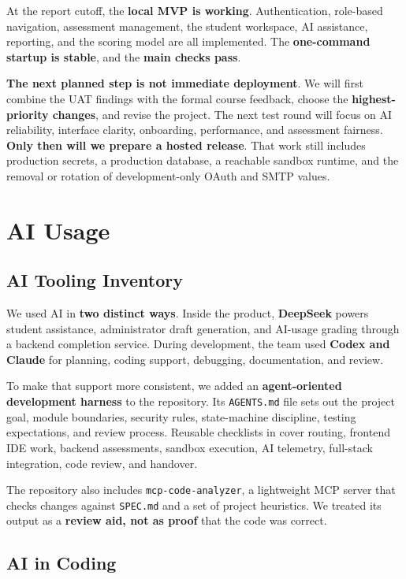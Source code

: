 \documentclass[11pt,a4paper]{article}
\begin{document}
At the report cutoff, the \textbf{local MVP is working}. Authentication, role-based navigation, assessment management, the student workspace, AI assistance, reporting, and the scoring model are all implemented. The \textbf{one-command startup is stable}, and the \textbf{main checks pass}.

\textbf{The next planned step is not immediate deployment}. We will first combine the UAT findings with the formal course feedback, choose the \textbf{highest-priority changes}, and revise the project. The next test round will focus on AI reliability, interface clarity, onboarding, performance, and assessment fairness. \textbf{Only then will we prepare a hosted release}. That work still includes production secrets, a production database, a reachable sandbox runtime, and the removal or rotation of development-only OAuth and SMTP values.

\section{AI Usage}

\subsection{AI Tooling Inventory}

We used AI in \textbf{two distinct ways}. Inside the product, \textbf{DeepSeek} powers student assistance, administrator draft generation, and AI-usage grading through a backend completion service. During development, the team used \textbf{Codex and Claude} for planning, coding support, debugging, documentation, and review.

To make that support more consistent, we added an \textbf{agent-oriented development harness} to the repository. Its \texttt{AGENTS.md} file sets out the project goal, module boundaries, security rules, state-machine discipline, testing expectations, and review process. Reusable checklists in  cover routing, frontend IDE work, backend assessments, sandbox execution, AI telemetry, full-stack integration, code review, and handover.

The repository also includes \texttt{mcp-code-analyzer}, a lightweight MCP server that checks changes against \texttt{SPEC.md} and a set of project heuristics. We treated its output as a \textbf{review aid, not as proof} that the code was correct.

\subsection{AI in Coding}
\end{document}
